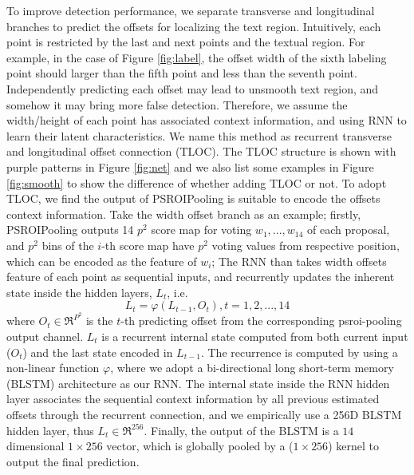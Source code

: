 \documentclass[10pt,twocolumn,letterpaper]{article}
\begin{document}
To improve detection performance, we separate transverse and longitudinal branches to predict the offsets for localizing the text region. Intuitively, each point is restricted by the last and next points and the textual region. For example, in the case of Figure \ref{fig:label}, the offset width of the sixth labeling point should larger than the fifth point and less than the seventh point. Independently predicting each offset may lead to unsmooth text region, and somehow it may bring more false detection. Therefore, we assume the width/height of each point has associated context information, and using RNN to learn their latent characteristics. We name this method as recurrent transverse and longitudinal offset connection (TLOC). The TLOC structure is shown with purple patterns in Figure \ref{fig:net} and we also list some examples in Figure \ref{fig:smooth} to show the difference of whether adding TLOC or not.
To adopt TLOC, we find the output of PSROIPooling is suitable to encode the offsets context information. Take the width offset branch as an example; firstly, PSROIPooling outputs 14 $p^2$ score map for voting $w_1, ..., w_{14}$ of each proposal, and $p^2$ bins of the $i$-th score map have $p^2$ voting values from respective position, which can be encoded as the feature of $w_i$; The RNN than takes width offsets feature of each point as sequential inputs, and recurrently updates the inherent state inside the hidden layers, $L_t$, i.e.
\begin{equation}\label{eq:recur}
  L_{t} = \varphi(L_{t-1}, O_t), t = 1,2,...,14
\end{equation}
where $O_t \in \Re^{P^{2}}$ is the $t$-th predicting offset from the corresponding psroi-pooling output channel. $L_t$ is a recurrent internal state computed from both current input ($O_t$) and the last state encoded in $L_{t-1}$. The recurrence is computed by using a non-linear function $\varphi$, where we adopt a bi-directional long short-term memory (BLSTM) architecture \cite{hochreiter1997long} as our RNN. The internal state inside the RNN hidden layer associates the sequential context information by all previous estimated offsets through the recurrent connection, and we empirically use a 256D BLSTM hidden layer, thus $L_{t} \in \Re^{256}$. Finally, the output of the BLSTM is a $14$ dimensional $1\times 256$ vector, which is globally pooled by a ($1\times 256$) kernel to output the final prediction.
\end{document}
